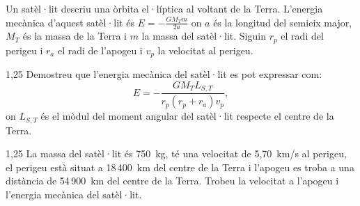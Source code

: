 Un satèl·lit descriu una òrbita el·líptica al voltant de la Terra. L'energia mecànica d'aquest satèl·lit és $E = -\frac{GM_Tm}{2a}$ on $a$ és la longitud del semieix major, $M_T$ és la massa de la Terra i $m$ la massa del satèl·lit. Siguin $r_p$ el radi del perigeu i $r_a$ el radi de l'apogeu i $v_p$ la velocitat al perigeu.

\begin{apartat}{1,25}
Demostreu que l'energia mecànica del satèl·lit es pot expressar com:
\[ E = -\frac{GM_TL_{S,T}}{r_p(r_p + r_a)v_p}, \]
on $L_{S,T}$ és el mòdul del moment angular del satèl·lit respecte el centre de la Terra.
\end{apartat}

\begin{apartat}{1,25}
La massa del satèl·lit és 750~kg, té una velocitat de 5,70~km/s al perigeu, el perigeu està situat a 18\,400~km del centre de la Terra i l'apogeu es troba a una distància de 54\,900~km del centre de la Terra. Trobeu la velocitat a l'apogeu i l'energia mecànica del satèl·lit.
\end{apartat}

